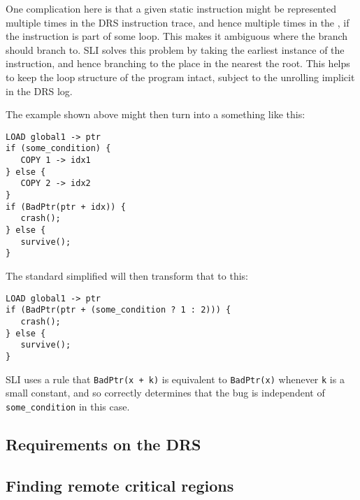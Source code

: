 One complication here is that a given static instruction might be represented multiple times in the DRS instruction trace, and hence multiple times in the \StateMachine, if the instruction is part of some loop.
This makes it ambiguous where the branch should branch to.
SLI solves this problem by taking the earliest instance of the instruction, and hence branching to the place in the \StateMachine nearest the root.
This helps to keep the loop structure of the program intact, subject to the unrolling implicit in the DRS log.

The example shown above might then turn into a \StateMachine something like this:

\begin{verbatim}
LOAD global1 -> ptr
if (some_condition) {
   COPY 1 -> idx1
} else {
   COPY 2 -> idx2
}
if (BadPtr(ptr + idx)) {
   crash();
} else {
   survive();
}
\end{verbatim}

The standard simplified will then transform that to this:

\begin{verbatim}
LOAD global1 -> ptr
if (BadPtr(ptr + (some_condition ? 1 : 2))) {
   crash();
} else {
   survive();
}
\end{verbatim}

SLI uses a rule that \verb|BadPtr(x + k)| is equivalent to \verb|BadPtr(x)| whenever \verb|k| is a small constant, and so correctly determines that the bug is independent of \verb|some_condition| in this case.


\subsection{Requirements on the DRS}

\subsection{Finding remote critical regions}

